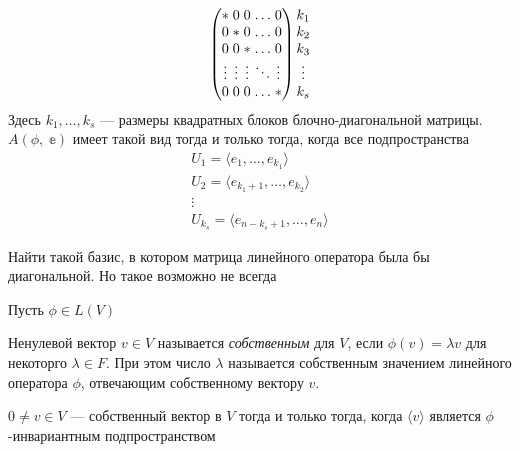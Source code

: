 \begin{Generalization}
     \[\begin{array}{cc}
  \arraycolsep=1.4pt
  \begin{pmatrix}
  * &0 &0 &\ldots &0\\
  0 &* &0 &\ldots &0 \\
  0 &0 &* &\ldots &0 \\
  \vdots &\vdots &\vdots &\ddots &\vdots\\
  0 &0 &0 &\ldots &*
  \end{pmatrix}
  \begin{matrix}
  k_1 \\ k_2 \\ k_3 \\ \vdots \\ k_s
  \end{matrix}
  \end{array}\]
  Здесь $k_1, \ldots, k_s$ --- размеры квадратных блоков блочно-диагональной матрицы. $A(\phi,\; \mathbb{e})$ имеет такой вид тогда и только тогда, когда все подпространства
  \begin{gather*}
      U_1 = \langle e_1, \ldots, e_{k_1}\rangle \\
      U_2 = \langle e_{k_1+1}, \ldots, e_{k_2} \rangle \\
      \vdots\\
      U_{k_s} = \langle e_{n-k_s+1}, \ldots, e_n \rangle
  \end{gather*}
\end{Generalization}
\begin{Thedream}
    Найти такой базис, в котором матрица линейного оператора была бы диагональной. Но такое возможно не всегда
\end{Thedream}

Пусть $\phi\in L(V)$
\begin{Def}
    Ненулевой вектор $v\in V$ называется \textit{собственным} для $V$, если $\phi(v) = \lambda v$ для некоторго $\lambda \in F$. При этом число $\lambda$ называется собственным значением линейного оператора $\phi$, отвечающим собственному вектору $v$.
\end{Def}
\begin{Suggestion}
    $0 \neq v \in V$ --- собственный вектор в $V$ тогда и только тогда, когда $\langle v \rangle$ является $\phi$-инвариантным подпространством
\end{Suggestion}


